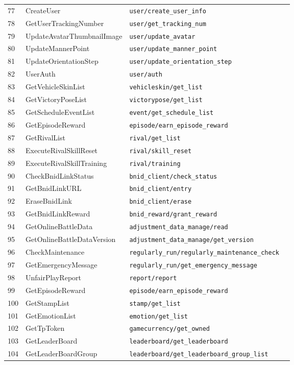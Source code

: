 \begin{longtable}{p{} p{} p{} p{}}
77  & CreateUser & \texttt{user/create\_user\_info} \\
78  & GetUserTrackingNumber & \texttt{user/get\_tracking\_num} \\
79  & UpdateAvatarThumbnailImage & \texttt{user/update\_avatar} \\
80  & UpdateMannerPoint & \texttt{user/update\_manner\_point} \\
81  & UpdateOrientationStep & \texttt{user/update\_orientation\_step} \\
82  & UserAuth & \texttt{user/auth} \\
83  & GetVehicleSkinList & \texttt{vehicleskin/get\_list} \\
84  & GetVictoryPoseList & \texttt{victorypose/get\_list} \\
85  & GetScheduleEventList & \texttt{event/get\_schedule\_list} \\
86  & GetEpisodeReward & \texttt{episode/earn\_episode\_reward} \\
87  & GetRivalList & \texttt{rival/get\_list} \\
88  & ExecuteRivalSkillReset & \texttt{rival/skill\_reset} \\
89  & ExecuteRivalSkillTraining & \texttt{rival/training} \\
90  & CheckBnidLinkStatus & \texttt{bnid\_client/check\_status} \\
91  & GetBnidLinkURL & \texttt{bnid\_client/entry} \\
92  & EraseBnidLink & \texttt{bnid\_client/erase} \\
93  & GetBnidLinkReward & \texttt{bnid\_reward/grant\_reward} \\
94  & GetOnlineBattleData & \texttt{adjustment\_data\_manage/read} \\
95  & GetOnlineBattleDataVersion & \texttt{adjustment\_data\_manage/get\_version} \\
96  & CheckMaintenance & \texttt{regularly\_run/regularly\_maintenance\_check} \\
97  & GetEmergencyMessage & \texttt{regularly\_run/get\_emergency\_message} \\
98  & UnfairPlayReport & \texttt{report/report} \\
99  & GetEpisodeReward & \texttt{episode/earn\_episode\_reward} \\
100 & GetStampList & \texttt{stamp/get\_list} \\
101 & GetEmotionList & \texttt{emotion/get\_list} \\
102 & GetTpToken & \texttt{gamecurrency/get\_owned} \\
103 & GetLeaderBoard & \texttt{leaderboard/get\_leaderboard} \\
104 & GetLeaderBoardGroup & \texttt{leaderboard/get\_leaderboard\_group\_list} \\

\bottomrule
\end{longtable}
\normalsize